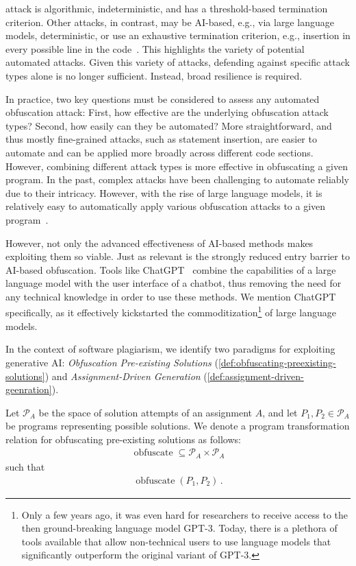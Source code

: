\mossad attack is algorithmic, indeterministic, and has a threshold-based termination criterion.
Other attacks, in contrast, may be AI-based, e.g., via large language models, deterministic, or use an exhaustive termination criterion, e.g., insertion in every possible line in the code~\cite{Saglam2024a, Saglam2024b}.
This highlights the variety of potential automated attacks. Given this variety of attacks, defending against specific attack types alone is no longer sufficient. Instead, broad resilience is required.

In practice, two key questions must be considered to assess any automated obfuscation attack: First, how effective are the underlying obfuscation attack types?
Second, how easily can they be automated? 
%
More straightforward, and thus mostly fine-grained attacks, such as statement insertion, are easier to automate and can be applied more broadly across different code sections.
However, combining different attack types is more effective in obfuscating a given program.
In the past, complex attacks have been challenging to automate reliably due to their intricacy.
However, with the rise of large language models, it is relatively easy to automatically apply various obfuscation attacks to a given program~\cite{Khalil_Er_2023, Daun2023, Saglam2024a}.

However, not only the advanced effectiveness of AI-based methods makes exploiting them so viable. Just as relevant is the strongly reduced entry barrier to AI-based obfuscation. Tools like ChatGPT~\cite{ChatGPT} combine the capabilities of a large language model with the user interface of a chatbot, thus removing the need for any technical knowledge in order to use these methods.
We mention ChatGPT specifically, as it effectively kickstarted the commoditization\footnote{Only a few years ago, it was even hard for researchers to receive access to the then ground-breaking language model GPT-3. Today, there is a plethora of tools available that allow non-technical users to use language models that significantly outperform the original variant of GPT-3.} of large language models.

In the context of software plagiarism, we identify two paradigms for exploiting generative AI: \textit{Obfuscation Pre-existing Solutions} (\autoref{def:obfuscating-preexisting-solutions}) and \textit{Assignment-Driven Generation} (\autoref{def:assignment-driven-geenration}).
\begin{theorem}
\label{def:obfuscating-preexisting-solutions}
Let  \(\mathcal{P}_A\) be the space of solution attempts of an assignment \(A\), and let \(P_1, P_2 \in \mathcal{P}_A\) be programs representing possible solutions. We denote a program transformation relation for obfuscating pre-existing solutions as follows:
\begin{align*}
    \operatorname{obfuscate} \subseteq \mathcal{P}_A \times \mathcal{P}_A
\end{align*}
such that
\begin{align*}
    \operatorname{obfuscate}(P_1, P_2)\,.
\end{align*}
\end{theorem}


